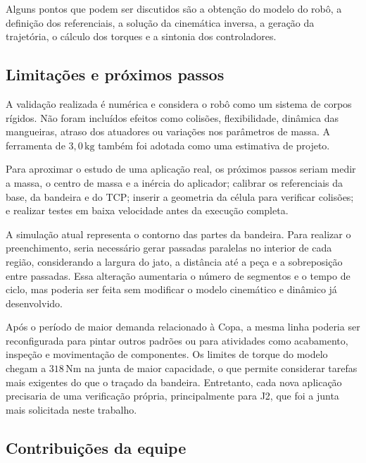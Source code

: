  Alguns pontos que podem ser discutidos são a obtenção do modelo do robô, a definição dos referenciais, a solução da cinemática inversa, a geração da trajetória, o cálculo dos torques e a sintonia dos controladores.

\subsection{Limitações e próximos passos}

A validação realizada é numérica e considera o robô como um sistema de corpos rígidos. Não foram incluídos efeitos como colisões, flexibilidade, dinâmica das mangueiras, atraso dos atuadores ou variações nos parâmetros de massa. A ferramenta de $3{,}0\,\text{kg}$ também foi adotada como uma estimativa de projeto.

Para aproximar o estudo de uma aplicação real, os próximos passos seriam medir a massa, o centro de massa e a inércia do aplicador; calibrar os referenciais da base, da bandeira e do TCP; inserir a geometria da célula para verificar colisões; e realizar testes em baixa velocidade antes da execução completa.

A simulação atual representa o contorno das partes da bandeira. Para realizar o preenchimento, seria necessário gerar passadas paralelas no interior de cada região, considerando a largura do jato, a distância até a peça e a sobreposição entre passadas. Essa alteração aumentaria o número de segmentos e o tempo de ciclo, mas poderia ser feita sem modificar o modelo cinemático e dinâmico já desenvolvido.

Após o período de maior demanda relacionado à Copa, a mesma linha poderia ser reconfigurada para pintar outros padrões ou para atividades como acabamento, inspeção e movimentação de componentes. Os limites de torque do modelo chegam a $318\,\text{Nm}$ na junta de maior capacidade, o que permite considerar tarefas mais exigentes do que o traçado da bandeira. Entretanto, cada nova aplicação precisaria de uma verificação própria, principalmente para J2, que foi a junta mais solicitada neste trabalho.

\subsection{Contribuições da equipe}

